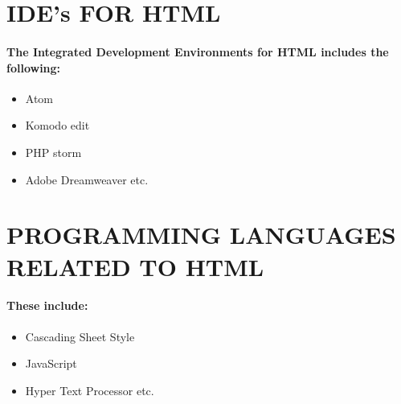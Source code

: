 \documentclass{article}
\begin{document}
	\section*{IDE’s FOR HTML}
	\paragraph{The Integrated Development Environments for HTML includes the following:}
	\begin{itemize}
		\item Atom
		\item Komodo edit
		\item PHP storm
		\item Adobe Dreamweaver etc.
		
	\end{itemize}
	\newpage
	\section*{PROGRAMMING LANGUAGES RELATED TO HTML}
	\paragraph{These include:
	}
	\begin{itemize}
		\item Cascading Sheet Style
		\item JavaScript
		\item Hyper Text Processor etc.
	\end{itemize}

\newpage
\pagecolor{black!98}
\color{white}
\end{document}
